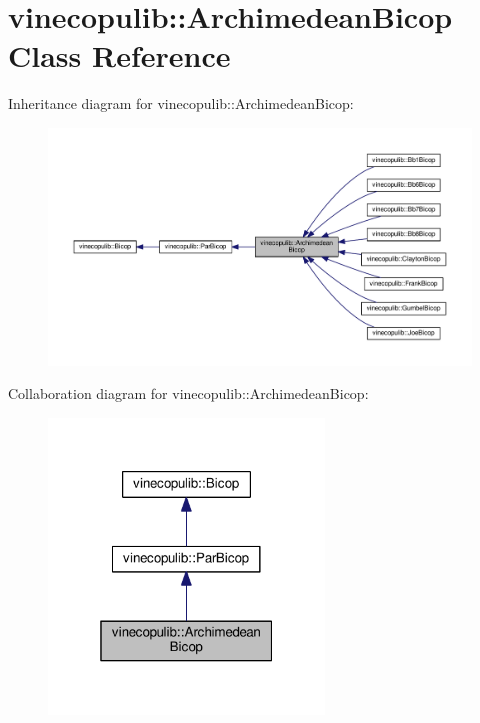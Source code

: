 \hypertarget{classvinecopulib_1_1_archimedean_bicop}{}\section{vinecopulib\+:\+:Archimedean\+Bicop Class Reference}
\label{classvinecopulib_1_1_archimedean_bicop}


Inheritance diagram for vinecopulib\+:\+:Archimedean\+Bicop\+:\nopagebreak
\begin{figure}[H]
\begin{center}
\leavevmode
\includegraphics[width=350pt]{classvinecopulib_1_1_archimedean_bicop__inherit__graph}
\end{center}
\end{figure}


Collaboration diagram for vinecopulib\+:\+:Archimedean\+Bicop\+:\nopagebreak
\begin{figure}[H]
\begin{center}
\leavevmode
\includegraphics[width=208pt]{classvinecopulib_1_1_archimedean_bicop__coll__graph}
\end{center}
\end{figure}
